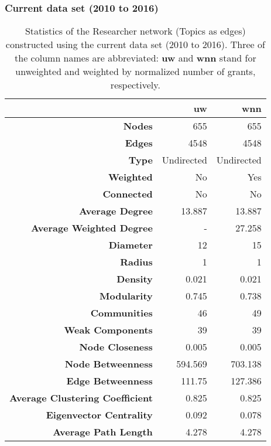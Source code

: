 \subsubsection{Current data set (2010 to 2016)}

\begin{table}[!htbp]
\centering
\caption[Statistics of the Researcher network (Topics as edges) constructed using the current data set (2010 to 2016)]{Statistics of the Researcher network (Topics as edges) constructed using the current data set (2010 to 2016). Three of the column names are abbreviated: \textbf{uw} and \textbf{wnn} stand for unweighted and weighted by normalized number of grants, respectively.}
\label{table:researcher_a_current_stats_appendix}
\begin{tabular}{r|rr}
{} & \textbf{uw} & \textbf{wnn}\\
\hline
\textbf{Nodes} & {655} & {655}\\
\textbf{Edges} & {4548} & {4548}\\
\textbf{Type} & {Undirected} & {Undirected}\\
\textbf{Weighted} & {No} & {Yes}\\
\textbf{Connected} & {No} & {No}\\
\textbf{Average Degree} & {13.887} & {13.887}\\
\textbf{Average Weighted Degree} & {-} & {27.258}\\
\textbf{Diameter} & {12} & {15}\\
\textbf{Radius} & {1} & {1}\\
\textbf{Density} & {0.021} & {0.021}\\
\textbf{Modularity} & {0.745} & {0.738}\\
\textbf{Communities} & {46} & {49}\\
\textbf{Weak Components} & {39} & {39}\\
\textbf{Node Closeness} & {0.005} & {0.005}\\
\textbf{Node Betweenness} & {594.569} & {703.138}\\
\textbf{Edge Betweenness} & {111.75} & {127.386}\\
\textbf{Average Clustering Coefficient} & {0.825} & {0.825}\\
\textbf{Eigenvector Centrality} & {0.092} & {0.078}\\
\textbf{Average Path Length} & {4.278} & {4.278}
\end{tabular}
\end{table}

